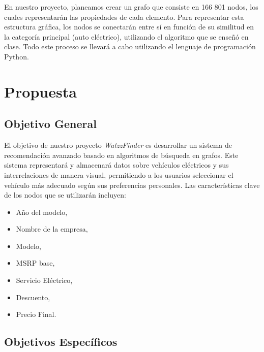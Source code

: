 \documentclass[12pt]{article}
\begin{document}
En nuestro proyecto, planeamos crear un grafo que consiste en 166 801 nodos, los cuales representarán las propiedades de cada elemento. Para representar esta estructura gráfica, los nodos se conectarán entre sí en función de su similitud en la categoría principal (auto eléctrico), utilizando el algoritmo que se enseñó en clase. Todo este proceso se llevará a cabo utilizando el lenguaje de programación Python.



\section{Propuesta}


\subsection{Objetivo General}

El objetivo de nuestro proyecto \textit{WatzzFinder} es desarrollar un sistema de recomendación avanzado basado en algoritmos de búsqueda en grafos. Este sistema representará y almacenará datos sobre vehículos eléctricos y sus interrelaciones de manera visual, permitiendo a los usuarios seleccionar el vehículo más adecuado según sus preferencias personales. Las características clave de los nodos que se utilizarán incluyen:
\begin{itemize}
    \item Año del modelo,
    \item Nombre de la empresa,
    \item Modelo,
    \item MSRP base,
    \item Servicio Eléctrico,
    \item Descuento,
    \item Precio Final.
\end{itemize}



\subsection{Objetivos Específicos}
\end{document}
